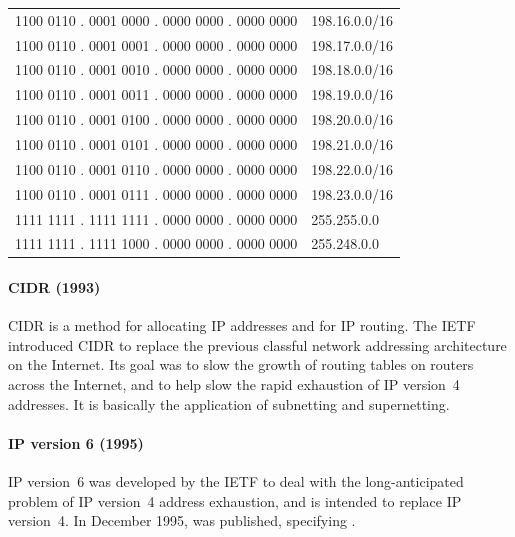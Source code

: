 \begin{center}
\tosfstyle
\begin{tabular}{@{}ll@{}}
\textcolor{spot1}{1100 0110 . 0001 0}\textcolor{spot2}{000} . 0000 0000 . 0000 0000 & 198.16.0.0/16 \\
\textcolor{spot1}{1100 0110 . 0001 0}\textcolor{spot2}{001} . 0000 0000 . 0000 0000 & 198.17.0.0/16 \\
\textcolor{spot1}{1100 0110 . 0001 0}\textcolor{spot2}{010} . 0000 0000 . 0000 0000 & 198.18.0.0/16 \\
\textcolor{spot1}{1100 0110 . 0001 0}\textcolor{spot2}{011} . 0000 0000 . 0000 0000 & 198.19.0.0/16 \\
\textcolor{spot1}{1100 0110 . 0001 0}\textcolor{spot2}{100} . 0000 0000 . 0000 0000 & 198.20.0.0/16 \\
\textcolor{spot1}{1100 0110 . 0001 0}\textcolor{spot2}{101} . 0000 0000 . 0000 0000 & 198.21.0.0/16 \\
\textcolor{spot1}{1100 0110 . 0001 0}\textcolor{spot2}{110} . 0000 0000 . 0000 0000 & 198.22.0.0/16 \\
\textcolor{spot1}{1100 0110 . 0001 0}\textcolor{spot2}{111} . 0000 0000 . 0000 0000 & 198.23.0.0/16 \\
\midrule
1111 1111 . 1111 1111 . 0000 0000 . 0000 0000 & 255.255.0.0 \\
1111 1111 . 1111 1000 . 0000 0000 . 0000 0000 & 255.248.0.0 \\
\end{tabular}
\end{center}

\paragraph{\acf{CIDR} (1993)}
\Acl{CIDR} is a method for allocating \acs{IP} addresses and for \acs{IP} routing.
The \gls{IETF} introduced \acs{CIDR} to replace the previous classful network addressing architecture on the Internet.
Its goal was to slow the growth of routing tables on routers across the Internet, and to help slow the rapid exhaustion of \acs{IP} version~4 addresses.
It is basically the application of subnetting and supernetting.

\paragraph{\acs{IP} version 6 (1995)}
\acs{IP} version~6 was developed by the \gls{IETF} to deal with the long-anticipated problem of \acs{IP} version~4 address exhaustion, and is intended to replace \acs{IP} version~4.
In December 1995,  was published, specifying \IPsix.

